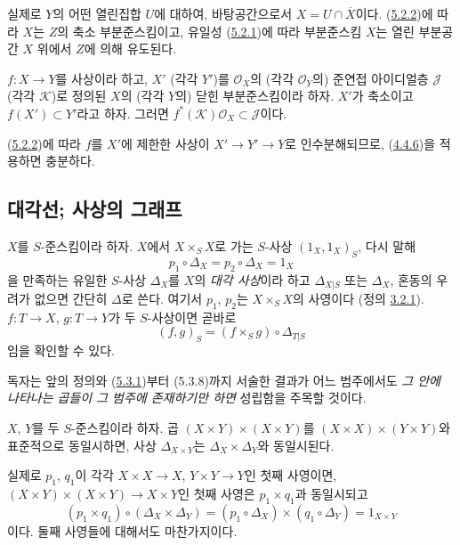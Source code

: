 실제로 $Y$의 어떤 열린집합 $U$에 대하여, 바탕공간으로서
$X=U\cap\overline{X}$이다. (\hyperref[I.5.2.2-ko]{5.2.2})에 따라 $X$는
$Z$의 축소 부분준스킴이고, 유일성
(\hyperref[I.5.2.1-ko]{5.2.1})에 따라 부분준스킴 $X$는 열린
부분공간 $X$ 위에서 $Z$에 의해 유도된다.

\begin{corollary}[5.2.4]
\label{I.5.2.4-ko}
$f:X\to Y$를 사상이라 하고, $X'$ (각각 $Y'$)를 $\mathscr{O}_X$의
(각각 $\mathscr{O}_Y$의) 준연접 아이디얼층 $\mathscr{J}$
(각각 $\mathscr{K}$)로 정의된 $X$의 (각각 $Y$의) 닫힌
부분준스킴이라 하자. $X'$가 축소이고 $f(X')\subset Y'$라고 하자.
그러면 $f^*(\mathscr{K})\mathscr{O}_X\subset\mathscr{J}$이다.
\end{corollary}

(\hyperref[I.5.2.2-ko]{5.2.2})에 따라 $f$를 $X'$에 제한한 사상이
$X'\to Y'\to Y$로 인수분해되므로,
(\hyperref[I.4.4.6-ko]{4.4.6})을 적용하면 충분하다.

\subsection{대각선; 사상의 그래프}
\label{subsection:I.5.3-ko}

\begin{env}[5.3.1]
\label{I.5.3.1-ko}
$X$를 $S$-준스킴이라 하자. $X$에서 $X\times_S X$로 가는
$S$-사상 $(1_X,1_X)_S$, 다시 말해
\[
  p_1\circ\Delta_X=p_2\circ\Delta_X=1_X
  \tag{5.3.1.1}\label{I.5.3.1.1-ko}
\]
을 만족하는 유일한 $S$-사상 $\Delta_X$를 $X$의 \emph{대각 사상}이라
하고 $\Delta_{X|S}$ 또는 $\Delta_X$, 혼동의 우려가 없으면 간단히
$\Delta$로 쓴다. 여기서 $p_1$, $p_2$는 $X\times_S X$의 사영이다
(정의 \hyperref[I.3.2.1-ko]{3.2.1}). $f:T\to X$, $g:T\to Y$가 두
$S$-사상이면 곧바로
\[
  (f,g)_S=(f\times_S g)\circ\Delta_{T|S}
  \tag{5.3.1.2}\label{I.5.3.1.2-ko}
\]
임을 확인할 수 있다.

독자는 앞의 정의와 (\hyperref[I.5.3.1-ko]{5.3.1})부터 (5.3.8)까지
서술한 결과가 어느 범주에서도
\emph{그 안에 나타나는 곱들이 그 범주에 존재하기만 하면} 성립함을
주목할 것이다.
\end{env}

\begin{proposition}[5.3.2]
\label{I.5.3.2-ko}
$X$, $Y$를 두 $S$-준스킴이라 하자. 곱
$(X\times Y)\times(X\times Y)$를
$(X\times X)\times(Y\times Y)$와 표준적으로 동일시하면, 사상
$\Delta_{X\times Y}$는 $\Delta_X\times\Delta_Y$와 동일시된다.
\end{proposition}

실제로 $p_1$, $q_1$이 각각 $X\times X\to X$,
$Y\times Y\to Y$인 첫째 사영이면,
$(X\times Y)\times(X\times Y)\to X\times Y$인 첫째 사영은
$p_1\times q_1$과 동일시되고
\[
  (p_1\times q_1)\circ(\Delta_X\times\Delta_Y)
  =(p_1\circ\Delta_X)\times(q_1\circ\Delta_Y)=1_{X\times Y}
\]
이다. 둘째 사영들에 대해서도 마찬가지이다.

